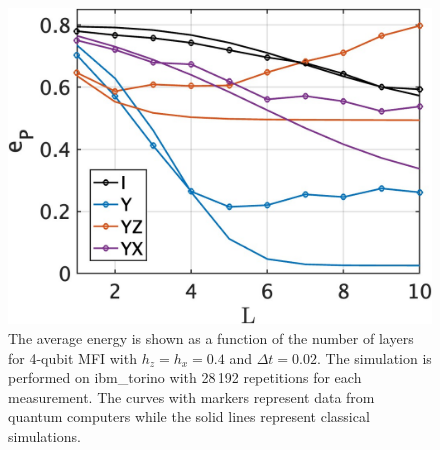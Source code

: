 \documentclass[twocolumn,aps,superscriptaddress,floatfix,longbibliography]{revtex4-2}
\begin{document}
\begin{figure}
\centering
\includegraphics[scale=.2]{experiment.jpg}
\caption{
    The average energy is shown as a function of the number of
    layers for 4-qubit MFI with $h_z=h_x=0.4$ and $\Delta t = 0.02$.
    The simulation is performed on ibm\_torino with 28\,192
    repetitions for each measurement. The curves with markers
    represent data from quantum computers while the solid lines represent
    classical simulations.
}\label{fig:experiment}
\end{figure}
\end{document}
